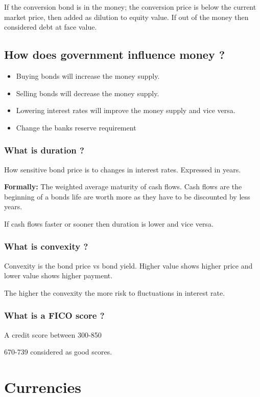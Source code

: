 \documentclass[11pt]{scrartcl} %
\begin{document}
If the conversion bond is in the money; the conversion price is below the current market price, then added as dilution to equity value. If out of the money then considered debt at face value.

\subsection{How does government influence money ?}

\begin{itemize}
	\item Buying bonds will increase the money supply.
	\item Selling bonds will decrease the money supply.
	\item Lowering interest rates will improve the money supply and vice versa.
	\item Change the banks reserve requirement
\end{itemize}

\subsubsection{What is duration ?}

How sensitive bond price is to changes in interest rates. Expressed in years.

\textbf{Formally:} The weighted average maturity of cash flows. Cash flows are the beginning of a bonds life are worth more as they have to be discounted by less years.

If cash flows faster or sooner then duration is lower and vice versa.

\subsubsection{What is convexity ?}

Convexity is the bond price vs bond yield. Higher value shows higher price and lower value shows higher payment.

The higher the convexity the more risk to fluctuations in interest rate. 

\subsubsection{What is a FICO score ?}

A credit score between 300-850

670-739 considered as good scores.

\section{Currencies}
\end{document}

